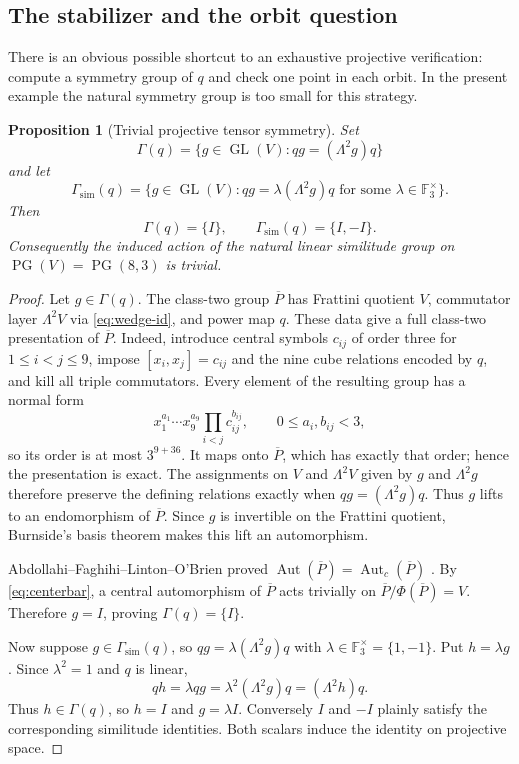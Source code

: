 \documentclass[10pt,a4paper]{amsart}
\newtheorem{proposition}[theorem]{Proposition}
\newcommand{\F}{\mathbb F}
\newcommand{\Aut}{\operatorname{Aut}}
\newcommand{\PG}{\operatorname{PG}}
\begin{document}
\subsection{The stabilizer and the orbit question}\label{subsec:stabilizer}

There is an obvious possible shortcut to an exhaustive projective
verification: compute a symmetry group of $q$ and check one point in each
orbit.  In the present example the natural symmetry group is too small for
this strategy.

\begin{proposition}[Trivial projective tensor symmetry]\label{prop:stabilizer}
Set
\[
 \Gamma(q)=\{g\in\operatorname{GL}(V):qg=(\Lambda^2g)q\}
\]
and let
\[
 \Gamma_{\mathrm{sim}}(q)=
 \{g\in\operatorname{GL}(V):qg=\lambda(\Lambda^2g)q
       \text{ for some }\lambda\in\F_3^\times\}.
\]
Then
\[
                 \Gamma(q)=\{I\},\qquad
                 \Gamma_{\mathrm{sim}}(q)=\{I,-I\}.
\]
Consequently the induced action of the natural linear similitude group on
$\PG(V)=\PG(8,3)$ is trivial.
\end{proposition}

\begin{proof}
Let $g\in\Gamma(q)$.  The class-two group $\overline P$ has Frattini
quotient $V$, commutator layer $\Lambda^2V$ via
\eqref{eq:wedge-id}, and power map $q$.  These data give a full class-two presentation of $\overline P$.  Indeed,
introduce central symbols $c_{ij}$ of order three for $1\le i<j\le9$,
impose $[x_i,x_j]=c_{ij}$ and the nine cube relations encoded by $q$, and
kill all triple commutators.  Every element of the resulting group has a
normal form
\[
 x_1^{a_1}\cdots x_9^{a_9}
 \prod_{i<j}c_{ij}^{b_{ij}},\qquad
 0\le a_i,b_{ij}<3,
\]
so its order is at most $3^{9+36}$.  It maps onto $\overline P$, which
has exactly that order; hence the presentation is exact.  The assignments
on $V$ and $\Lambda^2V$ given by $g$ and $\Lambda^2g$ therefore preserve
the defining relations exactly when $qg=(\Lambda^2g)q$.  Thus $g$ lifts
to an endomorphism of $\overline P$.  Since $g$ is invertible on the
Frattini quotient, Burnside's basis theorem makes this lift an
automorphism.

Abdollahi--Faghihi--Linton--O'Brien proved
$\Aut(\overline P)=\Aut_c(\overline P)$
\cite[Lemma~3.1, p.~5]{AFLObrien10}.  By \eqref{eq:centerbar}, a central
automorphism of $\overline P$ acts trivially on
$\overline P/\Phi(\overline P)=V$.  Therefore $g=I$, proving
$\Gamma(q)=\{I\}$.

Now suppose $g\in\Gamma_{\mathrm{sim}}(q)$, so
$qg=\lambda(\Lambda^2g)q$ with
$\lambda\in\F_3^\times=\{1,-1\}$.  Put $h=\lambda g$.  Since
$\lambda^2=1$ and $q$ is linear,
\[
 qh=\lambda qg=\lambda^2(\Lambda^2g)q
    =(\Lambda^2h)q.
\]
Thus $h\in\Gamma(q)$, so $h=I$ and $g=\lambda I$.  Conversely $I$
and $-I$ plainly satisfy the corresponding similitude identities.  Both
scalars induce the identity on projective space.
\end{proof}
\end{document}
